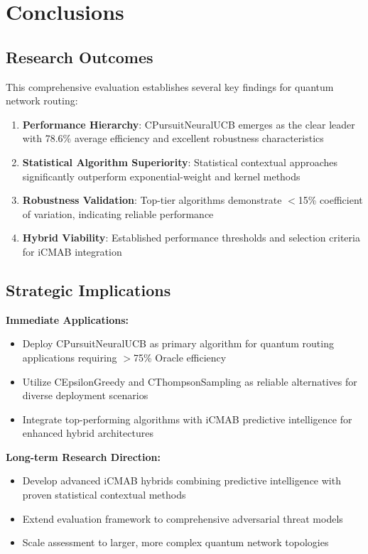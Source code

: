 \documentclass[12pt,a4paper]{article}
\newcommand{\primarytext}[1]{\textcolor{primaryblue}{\textbf{#1}}}
\newcommand{\secondarytext}[1]{\textcolor{secondaryblue}{\textbf{#1}}}
\newcommand{\success}[1]{\textcolor{accentgreen}{\textbf{#1}}}
\begin{document}
\newpage
\section{Conclusions}

\subsection{Research Outcomes}

This comprehensive evaluation establishes several key findings for quantum network routing:

\begin{enumerate}
\item \primarytext{Performance Hierarchy}: CPursuitNeuralUCB emerges as the clear leader with 78.6\% average efficiency and excellent robustness characteristics
\item \success{Statistical Algorithm Superiority}: Statistical contextual approaches significantly outperform exponential-weight and kernel methods
\item \secondarytext{Robustness Validation}: Top-tier algorithms demonstrate $<$15\% coefficient of variation, indicating reliable performance
\item \textbf{Hybrid Viability}: Established performance thresholds and selection criteria for iCMAB integration
\end{enumerate}

\subsection{Strategic Implications}

\textbf{Immediate Applications:}
\begin{itemize}
\item Deploy CPursuitNeuralUCB as primary algorithm for quantum routing applications requiring $>$75\% Oracle efficiency
\item Utilize CEpsilonGreedy and CThompsonSampling as reliable alternatives for diverse deployment scenarios
\item Integrate top-performing algorithms with iCMAB predictive intelligence for enhanced hybrid architectures
\end{itemize}

\textbf{Long-term Research Direction:}
\begin{itemize}
\item Develop advanced iCMAB hybrids combining predictive intelligence with proven statistical contextual methods
\item Extend evaluation framework to comprehensive adversarial threat models
\item Scale assessment to larger, more complex quantum network topologies
\end{itemize}
\end{document}
